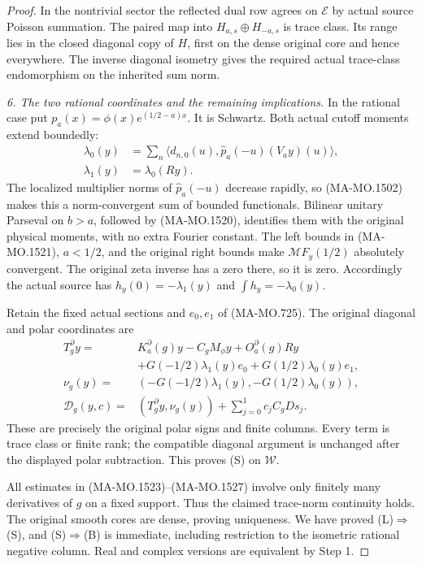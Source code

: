 \begin{proof}
In the nontrivial sector the reflected dual row agrees
on $\mathcal E$ by actual source Poisson summation.
The paired map into $H_{a,s}\oplus H_{-a,s}$ is trace
class.  Its range lies in the closed diagonal copy of
$H$, first on the dense original core and hence everywhere.
The inverse diagonal isometry gives the required actual
trace-class endomorphism on the inherited sum norm.

\emph{6. The two rational coordinates and the remaining implications.}
In the rational case put $p_a(x)=\phi(x)e^{(1/2-a)x}$.
It is Schwartz.  Both actual cutoff moments extend boundedly:
\[
\begin{aligned}
 \lambda_0(y)&=\sum_n\langle d_{n,0}(u),
                         \widehat p_a(-u)(V_ay)(u)\rangle,\\
 \lambda_1(y)&=\lambda_0(Ry).
\end{aligned}
\tag{MA-MO.1526}
\]
The localized multiplier norms of $\widehat p_a(-u)$ decrease
rapidly, so (MA-MO.1502) makes this a norm-convergent sum
of bounded functionals.  Bilinear unitary Parseval on
$b>a$, followed by (MA-MO.1520), identifies them with the
original physical moments, with no extra Fourier constant.
The left bounds in (MA-MO.1521), $a<1/2$, and the original
right bounds make $\mathcal MF_y(1/2)$ absolutely convergent.
The original zeta inverse has a zero there, so it is zero.
Accordingly the actual source has
$h_y(0)=-\lambda_1(y)$ and $\int h_y=-\lambda_0(y)$.

Retain the fixed actual sections and $e_0,e_1$ of
(MA-MO.725).  The original diagonal and polar coordinates are
\[
\begin{aligned}
 T_g^\partial y={}&K_a^\partial(g)y-C_gM_\phi y
                       +O_a^\partial(g)Ry\\
 &+G(-1/2)\lambda_1(y)e_0+G(1/2)\lambda_0(y)e_1,\\
 \nu_g(y)={}&(-G(-1/2)\lambda_1(y),-G(1/2)\lambda_0(y)),\\
 \mathscr D_g(y,c)={}&(T_g^\partial y,\nu_g(y))
                                  +\sum_{j=0}^1c_jC_gDs_j .
\end{aligned}
\tag{MA-MO.1527}
\]
These are precisely the original polar signs and finite
columns.  Every term is trace class or finite rank; the
compatible diagonal argument is unchanged after the
displayed polar subtraction.  This proves (S) on $\mathcal W$.

All estimates in (MA-MO.1523)--(MA-MO.1527) involve only
finitely many derivatives of $g$ on a fixed support.
Thus the claimed trace-norm continuity holds.  The original
smooth cores are dense, proving uniqueness.  We have proved
(L)$\Rightarrow$(S), and (S)$\Rightarrow$(B) is immediate,
including restriction to the isometric rational negative
column.  Real and complex versions are equivalent by
Step 1.


\end{proof}
